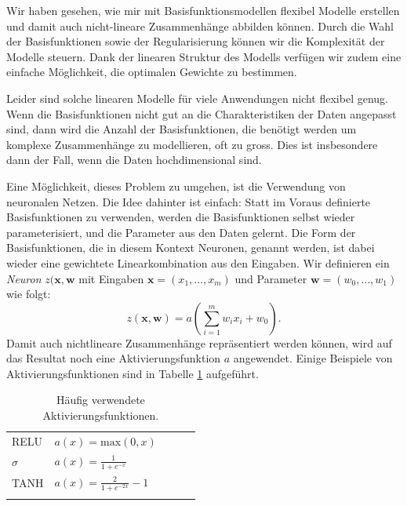 Wir haben gesehen, wie mir mit Basisfunktionsmodellen flexibel Modelle erstellen und damit auch nicht-lineare Zusammenhänge abbilden können. Durch die Wahl der Basisfunktionen 
sowie der Regularisierung können wir die Komplexität der Modelle steuern. 
Dank der linearen Struktur des Modells verfügen wir zudem eine einfache Möglichkeit,
die optimalen Gewichte zu bestimmen. 

Leider sind solche linearen Modelle für viele Anwendungen nicht flexibel genug. 
Wenn die Basisfunktionen nicht gut an die Charakteristiken der Daten angepasst sind, dann 
wird die Anzahl der Basisfunktionen, die
benötigt werden um komplexe Zusammenhänge zu modellieren, oft zu gross. Dies ist insbesondere dann der Fall, 
wenn die Daten hochdimensional sind.


Eine Möglichkeit, dieses Problem zu umgehen, ist die Verwendung von neuronalen Netzen.
Die Idee dahinter ist einfach: Statt im Voraus definierte Basisfunktionen zu verwenden, werden 
die Basisfunktionen selbst wieder parameterisiert, und die Parameter aus den Daten gelernt. 
Die Form der Basisfunktionen, die in diesem Kontext Neuronen, genannt werden, ist dabei wieder eine gewichtete 
Linearkombination aus den Eingaben.  Wir definieren  ein \emph{Neuron} $z(\textbf{x}, \textbf{w}$ mit Eingaben $\textbf{x} = (x_1, \ldots, x_m)$ und Parameter $\textbf{w} = (w_0, \ldots, w_1)$ wie folgt:
\[
   z(\textbf{x}, \textbf{w})=a(\sum_{i=1}^m w_{i}x_i + w_0).
\]
Damit auch nichtlineare Zusammenhänge repräsentiert werden können, wird auf das Resultat noch eine Aktivierungsfunktion $a$ angewendet. 
Einige Beispiele von Aktivierungsfunktionen sind in Tabelle \ref{ML:aktivierungsfunktionen} aufgeführt.

\begin{table}[h]
    \centering
    \begin{tabular}{lllll}
    \cline{1-2}
    \multicolumn{1}{|l|}{RELU}   & \multicolumn{1}{l|}{$a(x) = \mathrm{max}(0,x)$}              &  &  &  \\ \cline{1-2}
    \multicolumn{1}{|l|}{$\sigma$} & \multicolumn{1}{l|}{$a(x) = \frac{1}{1+e^{-x}}$}    &  &  &  \\ \cline{1-2}
    \multicolumn{1}{|l|}{TANH}   & \multicolumn{1}{l|}{$a(x) = \frac{2}{1+e^{-2x}}-1$} &  &  &  \\ \cline{1-2}
                                 &                                                   &  &  & 
    \end{tabular}
    \caption{Häufig verwendete Aktivierungsfunktionen.}
    \label{ML:aktivierungsfunktionen}
\end{table}

